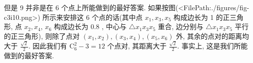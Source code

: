 但是 9 并非是在 6 个点上所能做到的最好答案.
如果按图(<FilePath:./figures/fig-c3i10.png>) 所示来安排这 6 个点的话(其中点 $x_1, x_3, x_5$ 构成边长为 1 的正三角形, 点 $x_2, x_4$, $x_6$ 构成边长为 0.8 , 中心与 $\triangle x_1 x_3 x_5$ 重合, 边分别与 $\triangle x_1 x_3 x_5$ 平行的正三角形), 则除了点对 $\left(x_1, x_2\right),\left(x_3, x_4\right),\left(x_5, x_6\right)$ 外, 其余的点对的距离均大于 $\frac{\sqrt{2}}{2}$. 因此我们有 $\mathrm{C}_6^2-3=12$ 个点对, 其距离大于 $\frac{\sqrt{2}}{2}$. 事实上, 这是我们所能做到的最好答案.


